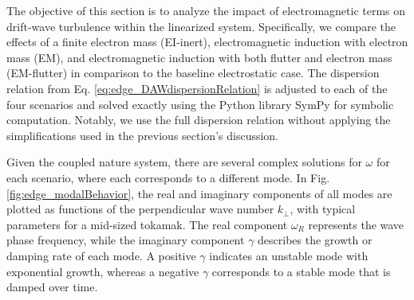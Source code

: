 The objective of this section is to analyze the impact of electromagnetic terms on drift-wave turbulence within the linearized system. Specifically, we compare the effects of a finite electron mass (EI-inert), electromagnetic induction with electron mass (EM), and electromagnetic induction with both flutter and electron mass (EM-flutter) in comparison to the baseline electrostatic case. The dispersion relation from Eq. \ref{eq:edge_DAWdispersionRelation} is adjusted to each of the four scenarios and solved exactly using the Python library SymPy for symbolic computation. Notably, we use the full dispersion relation without applying the simplifications used in the previous section's discussion.

Given the coupled nature system, there are several complex solutions for $\omega$ for each scenario, where each corresponds to a different mode. In Fig. \ref{fig:edge_modalBehavior}, the real and imaginary components of all modes are plotted as functions of the perpendicular wave number $k_\perp$, with typical parameters for a mid-sized tokamak. The real component $\omega_R$ represents the wave phase frequency, while the imaginary component $\gamma$ describes the growth or damping rate of each mode. A positive $\gamma$ indicates an unstable mode with exponential growth, whereas a negative $\gamma$ corresponds to a stable mode that is damped over time.

